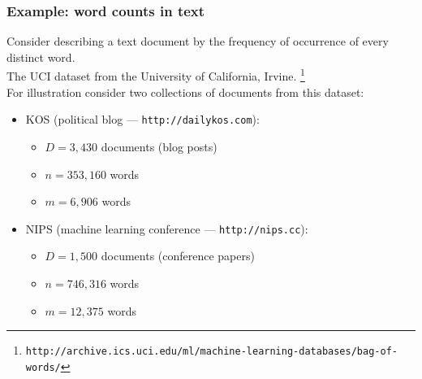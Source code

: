 \begin{frame}
\frametitle{Example: word counts in text}

Consider describing a text document by the frequency of occurrence of
every distinct word.\\[1ex]

The UCI  dataset from the University of California, Irvine. 
\footnote{\texttt{http://archive.ics.uci.edu/ml/machine-learning-databases/bag-of-words/}}\\
For illustration consider two collections of documents from this dataset:
\begin{itemize}
\item KOS (political blog --- \texttt{http://dailykos.com}): 
\begin{itemize}
\item $D=3,430$ documents (blog posts)
\item $n=353,160$ words
\item $m=6,906$  words
\end{itemize}
\item NIPS (machine learning conference --- \texttt{http://nips.cc}): 
\begin{itemize}
\item $D=1,500$ documents (conference papers)
\item $n=746,316$ words
\item $m=12,375$  words
\end{itemize}
\end{itemize}
\end{frame}


